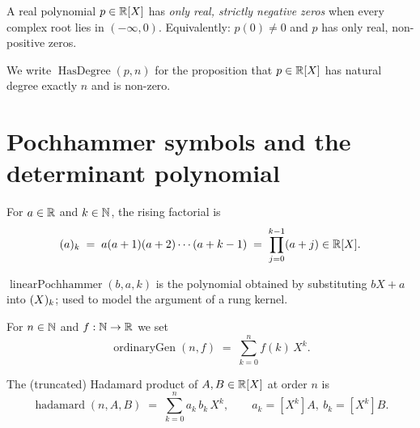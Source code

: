 \begin{definition}
  \label{def:HasOnlyRealNegativeZeros}
  \leanok
  A real polynomial $p \in \mathbb{R}[X]$ has \emph{only real, strictly
  negative zeros} when every complex root lies in $(-\infty, 0)$.
  Equivalently: $p(0) \neq 0$ and $p$ has only real, non-positive zeros.
\end{definition}

\begin{definition}
  \label{def:HasDegree}
  \leanok
  We write $\operatorname{HasDegree}(p, n)$ for the proposition that
  $p \in \mathbb{R}[X]$ has natural degree exactly $n$ and is non-zero.
\end{definition}

\section{Pochhammer symbols and the determinant polynomial}

\begin{definition}
  \label{def:pochhammer}
  \leanok
  For $a \in \mathbb{R}$ and $k \in \mathbb{N}$, the rising factorial is
  \[
    (a)_{k} \;=\; a(a+1)(a+2)\cdots(a+k-1)
        \;=\; \prod_{j=0}^{k-1}(a+j) \in \mathbb{R}[X].
  \]
\end{definition}

\begin{definition}
  \label{def:linearPochhammer}
  \leanok
  $\operatorname{linearPochhammer}(b, a, k)$ is the polynomial obtained
  by substituting $bX + a$ into $(X)_{k}$; used to model the
  argument of a rung kernel.
\end{definition}

\begin{definition}
  \label{def:ordinaryGen}
  \leanok
  For $n \in \mathbb{N}$ and $f : \mathbb{N} \to \mathbb{R}$ we set
  \[
    \operatorname{ordinaryGen}(n, f) \;=\; \sum_{k=0}^{n} f(k)\, X^{k}.
  \]
\end{definition}

\begin{definition}
  \label{def:hadamard}
  \leanok
  The (truncated) Hadamard product of $A, B \in \mathbb{R}[X]$ at order $n$ is
  \[
    \operatorname{hadamard}(n, A, B) \;=\; \sum_{k=0}^{n}
        a_k\, b_k\, X^{k}, \qquad
    a_k = [X^k] A,\ b_k = [X^k] B.
  \]
\end{definition}

